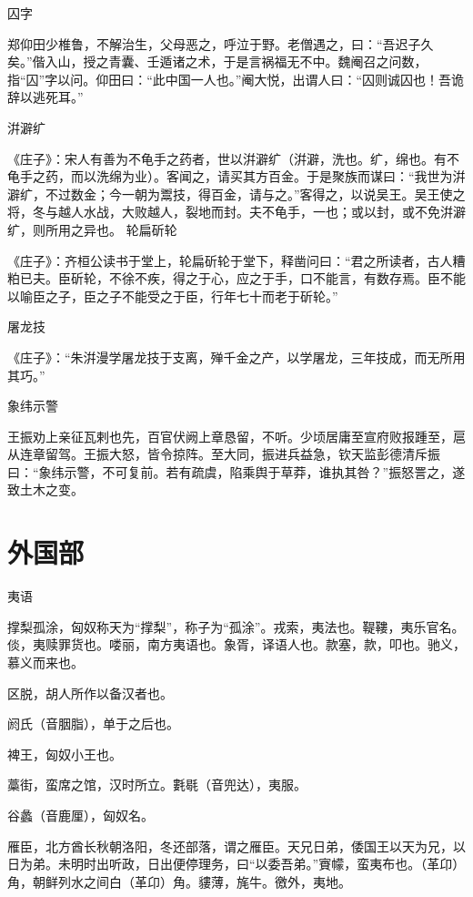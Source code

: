 \documentclass[a4paper,12pt,UTF8,twoside]{ctexbook}
\begin{document}
    囚字
    
    郑仰田少椎鲁，不解治生，父母恶之，呼泣于野。老僧遇之，曰：“吾迟子久矣。”偕入山，授之青囊、壬遁诸之术，于是言祸福无不中。魏阉召之问数，指“囚”字以问。仰田曰：“此中国一人也。”阉大悦，出谓人曰：“囚则诚囚也！吾诡辞以逃死耳。”
    
    洴澼纩
    
    《庄子》：宋人有善为不龟手之药者，世以洴澼纩（洴澼，洗也。纩，绵也。有不龟手之药，而以洗绵为业）。客闻之，请买其方百金。于是聚族而谋曰：“我世为洴澼纩，不过数金；今一朝为鬻技，得百金，请与之。”客得之，以说吴王。吴王使之将，冬与越人水战，大败越人，裂地而封。夫不龟手，一也；或以封，或不免洴澼纩，则所用之异也。
    轮扁斫轮
    
    《庄子》：齐桓公读书于堂上，轮扁斫轮于堂下，释凿问曰：“君之所读者，古人糟粕已夫。臣斫轮，不徐不疾，得之于心，应之于手，口不能言，有数存焉。臣不能以喻臣之子，臣之子不能受之于臣，行年七十而老于斫轮。”
    
    屠龙技
    
    《庄子》：“朱洴漫学屠龙技于支离，殚千金之产，以学屠龙，三年技成，而无所用其巧。”
    
    象纬示警
    
    王振劝上亲征瓦剌也先，百官伏阙上章恳留，不听。少顷居庸至宣府败报踵至，扈从连章留驾。王振大怒，皆令掠阵。至大同，振进兵益急，钦天监彭德清斥振曰：“象纬示警，不可复前。若有疏虞，陷乘舆于草莽，谁执其咎？”振怒詈之，遂致土木之变。
    
    \part{外国部}
    
    夷语
    
    撑梨孤涂，匈奴称天为“撑梨”，称子为“孤涂”。戎索，夷法也。鞮鞻，夷乐官名。倓，夷赎罪货也。喽丽，南方夷语也。象胥，译语人也。款塞，款，叩也。驰义，慕义而来也。
    
    区脱，胡人所作以备汉者也。
    
    阏氏（音胭脂），单于之后也。
    
    裨王，匈奴小王也。
    
    藁街，蛮席之馆，汉时所立。氀毼（音兜达），夷服。
    
    谷蠡（音鹿厘），匈奴名。
    
    雁臣，北方酋长秋朝洛阳，冬还部落，谓之雁臣。天兄日弟，倭国王以天为兄，以日为弟。未明时出听政，日出便停理务，曰“以委吾弟。”賨幪，蛮夷布也。（革卬）角，朝鲜列水之间白（革卬）角。貗薄，旄牛。徼外，夷地。
    
\end{document}
